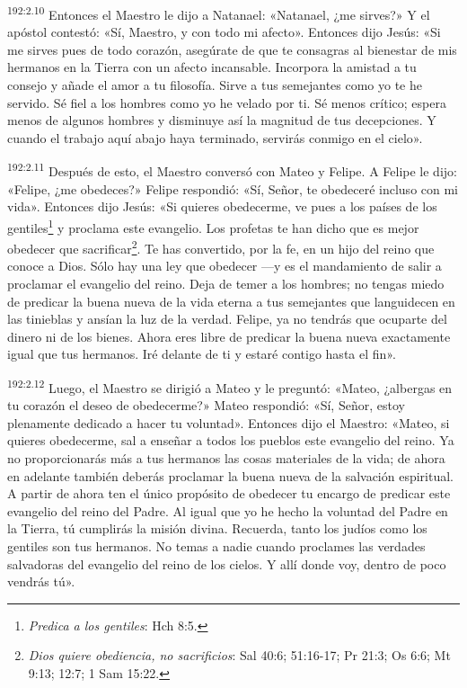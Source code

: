 \par
\textsuperscript{192:2.10} Entonces el Maestro le dijo a Natanael: «Natanael, ¿me sirves?» Y el apóstol contestó: «Sí, Maestro, y con todo mi afecto». Entonces dijo Jesús: «Si me sirves pues de todo corazón, asegúrate de que te consagras al bienestar de mis hermanos en la Tierra con un afecto incansable. Incorpora la amistad a tu consejo y añade el amor a tu filosofía. Sirve a tus semejantes como yo te he servido. Sé fiel a los hombres como yo he velado por ti. Sé menos crítico; espera menos de algunos hombres y disminuye así la magnitud de tus decepciones. Y cuando el trabajo aquí abajo haya terminado, servirás conmigo en el cielo».

\par
\textsuperscript{192:2.11} Después de esto, el Maestro conversó con Mateo y Felipe. A Felipe le dijo: «Felipe, ¿me obedeces?» Felipe respondió: «Sí, Señor, te obedeceré incluso con mi vida». Entonces dijo Jesús: «Si quieres obedecerme, ve pues a los países de los gentiles\footnote{\textit{Predica a los gentiles}: Hch 8:5.} y proclama este evangelio. Los profetas te han dicho que es mejor obedecer que sacrificar\footnote{\textit{Dios quiere obediencia, no sacrificios}: Sal 40:6; 51:16-17; Pr 21:3; Os 6:6; Mt 9:13; 12:7; 1 Sam 15:22.}. Te has convertido, por la fe, en un hijo del reino que conoce a Dios. Sólo hay una ley que obedecer ---y es el mandamiento de salir a proclamar el evangelio del reino. Deja de temer a los hombres; no tengas miedo de predicar la buena nueva de la vida eterna a tus semejantes que languidecen en las tinieblas y ansían la luz de la verdad. Felipe, ya no tendrás que ocuparte del dinero ni de los bienes. Ahora eres libre de predicar la buena nueva exactamente igual que tus hermanos. Iré delante de ti y estaré contigo hasta el fin».

\par
\textsuperscript{192:2.12} Luego, el Maestro se dirigió a Mateo y le preguntó: «Mateo, ¿albergas en tu corazón el deseo de obedecerme?» Mateo respondió: «Sí, Señor, estoy plenamente dedicado a hacer tu voluntad». Entonces dijo el Maestro: «Mateo, si quieres obedecerme, sal a enseñar a todos los pueblos este evangelio del reino. Ya no proporcionarás más a tus hermanos las cosas materiales de la vida; de ahora en adelante también deberás proclamar la buena nueva de la salvación espiritual. A partir de ahora ten el único propósito de obedecer tu encargo de predicar este evangelio del reino del Padre. Al igual que yo he hecho la voluntad del Padre en la Tierra, tú cumplirás la misión divina. Recuerda, tanto los judíos como los gentiles son tus hermanos. No temas a nadie cuando proclames las verdades salvadoras del evangelio del reino de los cielos. Y allí donde voy, dentro de poco vendrás tú».

